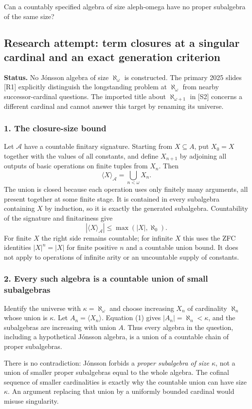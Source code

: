 \documentclass[11pt,a4paper]{article}
\begin{document}
Can a countably specified algebra of size aleph-omega have no proper subalgebra of the same size?

\subsection{Research attempt: term closures at a singular cardinal and an exact generation criterion}
\textbf{Status.} No Jónsson algebra of size $\aleph_\omega$ is constructed. The primary 2025 slides [R1] explicitly distinguish the longstanding problem at $\aleph_\omega$ from nearby successor-cardinal questions. The imported title about $\aleph_{\omega+1}$ in [S2] concerns a different cardinal and cannot answer this target by renaming its universe.

\subsubsection{1. The closure-size bound}
Let $\mathcal A$ have a countable finitary signature. Starting from $X\subseteq A$, put $X_0=X$ together with the values of all constants, and define $X_{n+1}$ by adjoining all outputs of basic operations on finite tuples from $X_n$. Then
\[\langle X\rangle_{\mathcal A}=\bigcup_{n<\omega}X_n.
\]
The union is closed because each operation uses only finitely many arguments, all present together at some finite stage. It is contained in every subalgebra containing $X$ by induction, so it is exactly the generated subalgebra. Countability of the signature and finitariness give
\[|\langle X\rangle_{\mathcal A}|\leq\max(|X|,\aleph_0).\tag{1}\]
For finite $X$ the right side remains countable; for infinite $X$ this uses the ZFC identities $|X|^n=|X|$ for finite positive $n$ and a countable union bound. It does not apply to operations of infinite arity or an uncountable supply of constants.

\subsubsection{2. Every such algebra is a countable union of small subalgebras}
Identify the universe with $\kappa=\aleph_\omega$ and choose increasing $X_n$ of cardinality $\aleph_n$ whose union is $\kappa$. Let $A_n=\langle X_n\rangle$. Equation (1) gives $|A_n|=\aleph_n<\kappa$, and the subalgebras are increasing with union $A$. Thus every algebra in the question, including a hypothetical Jónsson algebra, is a union of a countable chain of proper subalgebras.

There is no contradiction: Jónsson forbids a \emph{proper subalgebra of size $\kappa$}, not a union of smaller proper subalgebras equal to the whole algebra. The cofinal sequence of smaller cardinalities is exactly why the countable union can have size $\kappa$. An argument replacing that union by a uniformly bounded cardinal would misuse singularity.
\end{document}
